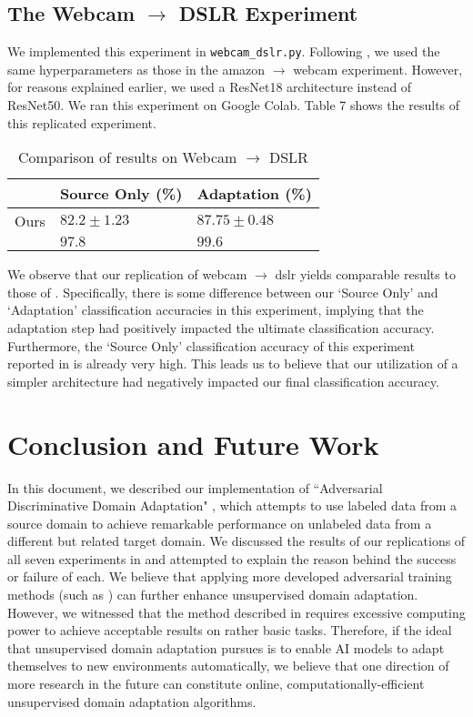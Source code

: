 \documentclass[14pt]{extarticle}
\begin{document}
		\subsection{The Webcam $\rightarrow$ DSLR Experiment}
		We implemented this experiment in \texttt{webcam\_dslr.py}. Following \cite{adda}, we used the same hyperparameters as those in the amazon $\rightarrow$ webcam experiment. However, for reasons explained earlier, we used a ResNet18 architecture instead of ResNet50. We ran this experiment on Google Colab. Table 7 shows the results of this replicated experiment.
		\begin{table}[H]
			\centering
			\begin{tabular}{|P{40mm}|P{40mm}|P{40mm}|}
				\hline
				 & Source Only (\%) & Adaptation (\%)\\
				\hline
				Ours & $82.2 \pm 1.23$ & $87.75 \pm 0.48$\\
				\hline
				\cite{adda} & $97.8$ & $99.6$\\
				\hline
			\end{tabular}
			\caption{Comparison of results on Webcam $\rightarrow$ DSLR}
		\end{table}
		We observe that our replication of webcam $\rightarrow$ dslr yields comparable results to those of \cite{adda}. Specifically, there is some difference between our `Source Only' and `Adaptation' classification accuracies in this experiment, implying that the adaptation step had positively impacted the ultimate classification accuracy. Furthermore, the `Source Only' classification accuracy of this experiment reported in \cite{adda} is already very high. This leads us to believe that our utilization of a simpler architecture had negatively impacted our final classification accuracy.
		\section{Conclusion and Future Work}
		In this document, we described our implementation of ``Adversarial Discriminative Domain Adaptation" \cite{adda}, which attempts to use labeled data from a source domain to achieve remarkable performance on unlabeled data from a different but related target domain. We discussed the results of our replications of all seven experiments in \cite{adda} and attempted to explain the reason behind the success or failure of each. We believe that applying more developed adversarial training methods (such as \cite{wgan}) can further enhance unsupervised domain adaptation. However, we witnessed that the method described in \cite{adda} requires excessive computing power to achieve acceptable results on rather basic tasks. Therefore, if the ideal that unsupervised domain adaptation pursues is to enable AI models to adapt themselves to new environments automatically, we believe that one direction of more research in the future can constitute online, computationally-efficient unsupervised domain adaptation algorithms.
	
	
\end{document}

